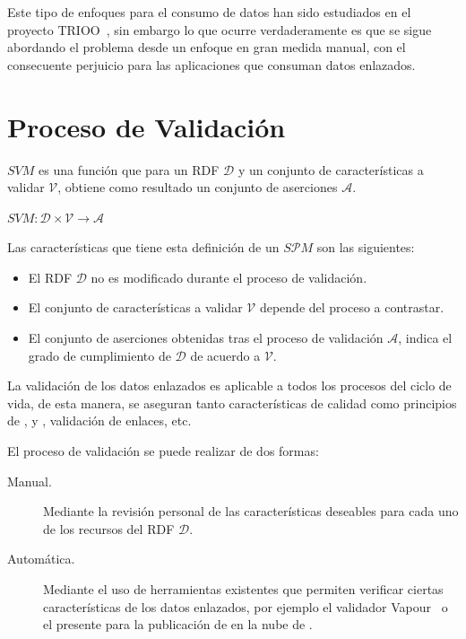Este tipo de enfoques para el consumo de datos han sido estudiados en el proyecto \gls{TRIOO}~\cite{DBLP:conf/icsoft/FernandezBRG10}, sin embargo 
lo que ocurre verdaderamente es que se sigue abordando el problema desde un enfoque en gran medida manual, con el consecuente perjuicio para las 
aplicaciones que consuman datos enlazados.

\section{Proceso de Validación}\label{sect:validation}
\begin{definition}
$SVM$ es una función que para un \dataset \gls{RDF} $\mathcal{D}$ y un conjunto de características
a validar $\mathcal{V}$, obtiene como resultado un conjunto de aserciones $\mathcal{A}$.
\end{definition}

\begin{center}
    $SVM :  \mathcal{D} \times \mathcal{V} \longrightarrow \mathcal{A}$
\end{center}
Las características que tiene esta definición de un $S\mathcal{P}M$  son las siguientes:
\begin{itemize}
 \item El \dataset RDF $\mathcal{D}$ no es modificado durante el proceso de validación.
 \item El conjunto de características a validar $\mathcal{V}$ depende del proceso a contrastar.
 \item El conjunto de aserciones obtenidas tras el proceso de validación $\mathcal{A}$, indica el grado de cumplimiento de $\mathcal{D}$ de acuerdo a $\mathcal{V}$.
 \end{itemize}

La validación de los datos enlazados es aplicable a todos los procesos del ciclo de vida, de esta manera,
se aseguran tanto características de calidad como principios de \linkeddata, \opendata y \lod, validación
de enlaces, etc. 

El proceso de validación se puede realizar de dos formas:
\begin{description}
 \item [Manual.] Mediante la revisión personal de las características deseables para cada uno de los recursos del \dataset RDF $\mathcal{D}$.
 \item [Automática.] Mediante el uso de herramientas existentes que permiten verificar ciertas características de los datos enlazados, por ejemplo 
el validador Vapour~\cite{Berrueta08cookinghttp} o el presente para la publicación de \datasets en la nube de \linkeddata.
\end{description}

